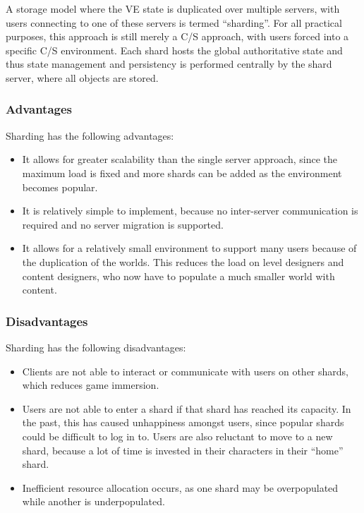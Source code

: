 A storage model where the VE state is duplicated over multiple servers, with users connecting to one of these servers is termed ``sharding''. For all practical purposes, this approach is still merely a C/S approach, with users forced into a specific C/S environment. Each shard hosts the global authoritative state and thus state management and persistency is performed centrally by the shard server, where all objects are stored.

\subsubsection{Advantages}

Sharding has the following advantages:
\begin{itemize}

\item It allows for greater scalability than the single server approach, since the maximum load is fixed and more shards can be added as the environment becomes popular.

\item It is relatively simple to implement, because no inter-server communication is required and no server migration is supported.

\item It allows for a relatively small environment to support many users because of the duplication of the worlds. This reduces the load on level designers and content designers, who now have to populate a much smaller world with content.
\end{itemize}

\subsubsection{Disadvantages}

Sharding has the following disadvantages:
\begin{itemize}
\item Clients are not able to interact or communicate with users on other shards, which reduces game immersion.

\item Users are not able to enter a shard if that shard has reached its capacity. In the past, this has caused unhappiness amongst users, since popular shards could be difficult to log in to. Users are also reluctant to move to a new shard, because a lot of time is invested in their characters in their ``home'' shard.

\item Inefficient resource allocation occurs, as one shard may be overpopulated while another is underpopulated.
\end{itemize}

